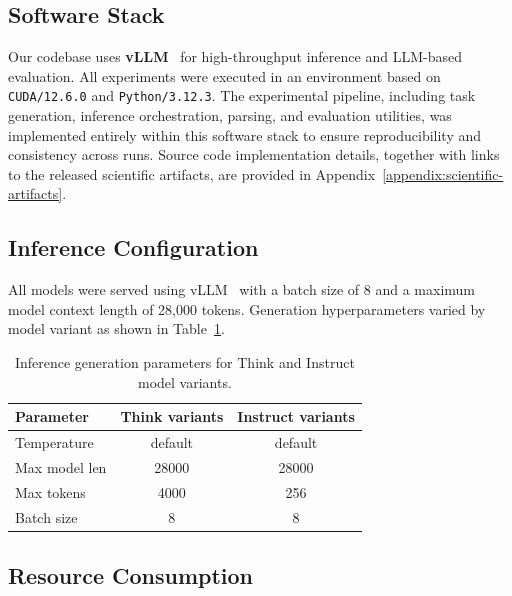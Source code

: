 \documentclass[11pt]{article}
\theoremstyle{definition}
\begin{document}
\subsection{Software Stack}
\label{appendix:infrastructure-software-stack-foundry}

Our codebase uses \textbf{vLLM}~\citep{kwon2023efficient} for high-throughput inference and LLM-based evaluation. All experiments were executed in an environment based on \texttt{CUDA/12.6.0} and \texttt{Python/3.12.3}. The experimental pipeline, including task generation, inference orchestration, parsing, and evaluation utilities, was implemented entirely within this software stack to ensure reproducibility and consistency across runs. Source code implementation details, together with links to the released scientific artifacts, are provided in Appendix~\ref{appendix:scientific-artifacts}.

\subsection{Inference Configuration}
\label{appendix:inference-config}
All models were served using vLLM~\citep{kwon2023efficient} with a batch size of 8 and a maximum model context length of 28{,}000 tokens. Generation hyperparameters varied by model variant as shown in Table~\ref{tab:inference-config}.

\begin{table}[ht]
\centering
\small
\begin{tabular}{lcc}
\toprule
\textbf{Parameter} & \textbf{Think variants} & \textbf{Instruct variants} \\
\midrule
Temperature        & default                 & default                    \\
Max model len      & 28000                   & 28000                      \\
Max tokens         & 4000                    & 256                        \\
Batch size         & 8                       & 8                          \\
\bottomrule
\end{tabular}
\caption{Inference generation parameters for Think and Instruct model variants.}
\label{tab:inference-config}
\end{table}

\subsection{Resource Consumption}
\end{document}
